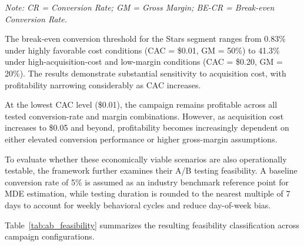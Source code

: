 \documentclass[conference]{IEEEtran}
\begin{document}
\noindent\textit{Note: CR = Conversion Rate; GM = Gross 
Margin; BE-CR = Break-even Conversion Rate.}

\vspace{0.5em}

The break-even conversion threshold for the Stars segment
ranges from 0.83\% under highly favorable cost conditions
(CAC = \$0.01, GM = 50\%) to 41.3\% under high-acquisition-cost
and low-margin conditions (CAC = \$0.20, GM = 20\%). The
results demonstrate substantial sensitivity to acquisition
cost, with profitability narrowing considerably as CAC
increases.

At the lowest CAC level (\$0.01), the campaign remains
profitable across all tested conversion-rate and margin
combinations. However, as acquisition cost increases to
\$0.05 and beyond, profitability becomes increasingly
dependent on either elevated conversion performance or
higher gross-margin assumptions.

To evaluate whether these economically viable scenarios are
also operationally testable, the framework further examines
their A/B testing feasibility. A baseline conversion rate
of 5\% is assumed as an industry benchmark reference point
for MDE estimation, while testing duration is rounded to
the nearest multiple of 7 days to account for weekly
behavioral cycles and reduce day-of-week bias.

Table~\ref{tab:ab_feasibility} summarizes the resulting
feasibility classification across campaign configurations.
\end{document}
